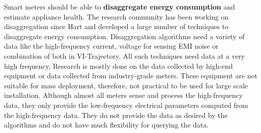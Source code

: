 Smart meters should be able to \textbf{disaggregate energy consumption} and estimate appliance health. The research community has been working on disaggregation since Hart \cite{hartNonintrusiveApplianceLoad1992} and developed a large number of techniques to disaggregate energy consumption.  Disaggregation algorithms need a variety of data like the high-frequency current, voltage for sensing EMI noise or combination of both in VI-Trajectory. All such techniques need data at a very high frequency,  Research is mostly done on the data collected by high-end equipment or data collected from industry-grade meters. These equipment are not suitable for mass deployment, therefore, not practical to be used for large scale installation.  Although almost all meters sense and process the high-frequency data, they only provide the low-frequency electrical parameters computed from the high-frequency data. They do not provide the data as desired by the algorithms and do not have much flexibility for querying the data.
